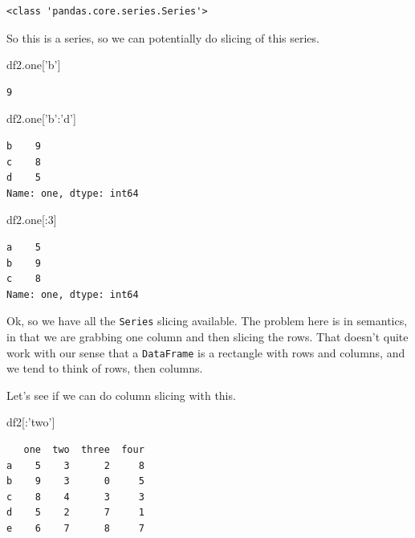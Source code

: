 \documentclass[
  letterpaper,
]{scrbook}
\newenvironment{Shaded}{\begin{snugshade}}{\end{snugshade}}
\newcommand{\DecValTok}[1]{\textcolor[rgb]{0.00,0.00,0.81}{#1}}
\newcommand{\NormalTok}[1]{#1}
\newcommand{\StringTok}[1]{\textcolor[rgb]{0.31,0.60,0.02}{#1}}
\begin{document}
\begin{verbatim}
<class 'pandas.core.series.Series'>
\end{verbatim}

So this is a series, so we can potentially do slicing of this series.

\begin{Shaded}
\begin{Highlighting}[]
\NormalTok{df2.one[}\StringTok{'b'}\NormalTok{]}
\end{Highlighting}
\end{Shaded}

\begin{verbatim}
9
\end{verbatim}

\begin{Shaded}
\begin{Highlighting}[]
\NormalTok{df2.one[}\StringTok{'b'}\NormalTok{:}\StringTok{'d'}\NormalTok{]}
\end{Highlighting}
\end{Shaded}

\begin{verbatim}
b    9
c    8
d    5
Name: one, dtype: int64
\end{verbatim}

\begin{Shaded}
\begin{Highlighting}[]
\NormalTok{df2.one[:}\DecValTok{3}\NormalTok{]}
\end{Highlighting}
\end{Shaded}

\begin{verbatim}
a    5
b    9
c    8
Name: one, dtype: int64
\end{verbatim}

Ok, so we have all the \texttt{Series} slicing available. The problem here is in semantics, in that we are grabbing one column and then slicing the rows. That doesn't quite work with our sense that a \texttt{DataFrame} is a rectangle with rows and columns, and we tend to think of rows, then columns.

Let's see if we can do column slicing with this.

\begin{Shaded}
\begin{Highlighting}[]
\NormalTok{df2[:}\StringTok{'two'}\NormalTok{]}
\end{Highlighting}
\end{Shaded}

\begin{verbatim}
   one  two  three  four
a    5    3      2     8
b    9    3      0     5
c    8    4      3     3
d    5    2      7     1
e    6    7      8     7
\end{verbatim}
\end{document}
